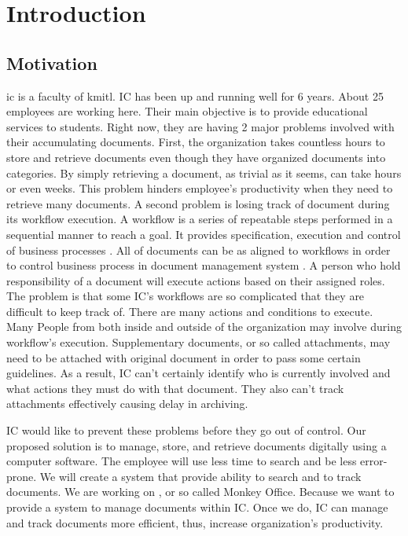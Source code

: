 \chapter{Introduction}

\section{Motivation}
\gls{ic} is a faculty of \gls{kmitl}. 
IC has been up and running well for 6 years.
About 25 employees are working here.
Their main objective is to provide educational services to students. 
Right now, they are having 2 major problems involved with their accumulating documents.
First, the organization takes countless hours to store and retrieve documents even though they have organized documents into categories.
By simply retrieving a document, as trivial as it seems, can take hours or even weeks. 
This problem hinders employee's productivity when they need to retrieve many documents. 
A second problem is losing track of document during its workflow execution. 
A workflow is a series of repeatable steps performed in a sequential manner to reach a goal.
It provides specification, execution and control of business processes \cite{Jablonski:1996:WMM}. 
All of documents can be as aligned to workflows in order to control business process in document management system \cite{DBLP:journals/corr/AsiliT14}.
A person who hold responsibility of a document will execute actions based on their assigned roles.
The problem is that some IC's workflows are so complicated that they are difficult to keep track of.
There are many actions and conditions to execute.
Many People from both inside and outside of the organization may involve during workflow's execution.
Supplementary documents, or so called attachments, may need to be attached with original document in order to pass some certain guidelines.
As a result, IC can't certainly identify who is currently involved and what actions they must do with that document.
They also can't track attachments effectively causing delay in archiving.

IC would like to prevent these problems before they go out of control. 
Our proposed solution is to manage, store, and retrieve documents digitally using a computer software.
The employee will use less time to search and be less error-prone.
We will create a system that provide ability to search and to track documents.
We are working on \MakeLowercase{\dms}, or so called Monkey Office.
Because we want to provide a system to manage documents within IC.
Once we do, IC can manage and track documents more efficient, thus, increase organization's productivity.

